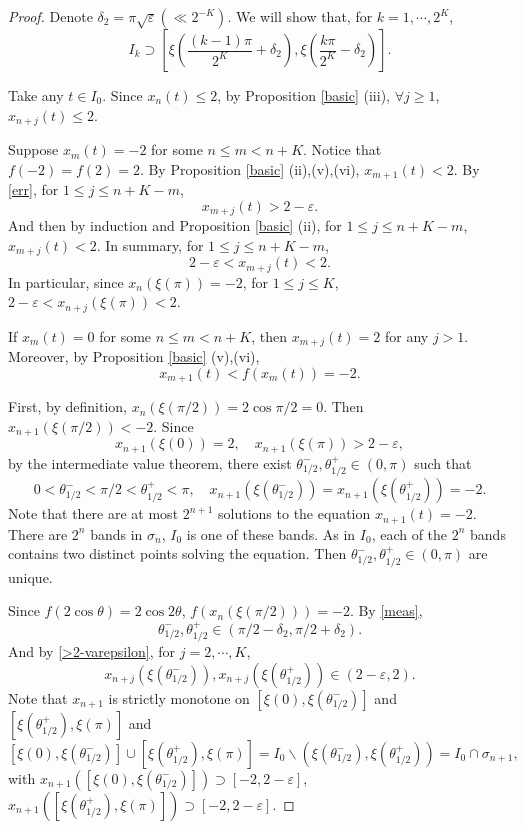 \documentclass{amsart}
\theoremstyle{definition}
\begin{document}
\begin{proof}
Denote $\delta_2=\pi\sqrt{\varepsilon}(\ll 2^{-K})$. 
We will show that, for $k=1,\cdots,2^K$,
$$I_k\supset[\xi(\frac{(k-1)\pi}{2^K}+\delta_2),\xi(\frac{k\pi}{2^K}-\delta_2)].$$

Take any $t\in I_0$. Since $x_n(t)\le2$, 
by Proposition \ref{basic} (iii), $\forall j\ge1$, $x_{n+j}(t)\le2$.

Suppose $x_m(t)=-2$ for some $n\le m< n+K$. Notice that $f(-2)=f(2)=2$.
By Proposition \ref{basic} (ii),(v),(vi), $x_{m+1}(t)<2.$
By \eqref{err}, for $1\le j\le n+K-m$,
\begin{equation}
    \label{>2-varepsilon}
x_{m+j}(t)>2-\varepsilon.
\end{equation}
And then by induction and Proposition \ref{basic} (ii), for $1\le j\le n+K-m$,
$x_{m+j}(t)<2.$
In summary, for $1\le j\le n+K-m$,
$$2-\varepsilon<x_{m+j}(t)<2.$$ 
In particular, since $x_n(\xi(\pi))=-2$, 
for $1\le j\le K$, $2-\varepsilon<x_{n+j}(\xi(\pi))<2$.


If $x_m(t)=0$ for some $n\le m< n+K$, then $x_{m+j}(t)=2$ for any $j>1$. 
Moreover, by Proposition \ref{basic} (v),(vi),
$$x_{m+1}(t)<f(x_m(t))=-2.$$

First, by definition, $x_n(\xi(\pi/2))=2\cos\pi/2=0$. 
Then $x_{n+1}(\xi(\pi/2))<-2$.
Since $$x_{n+1}(\xi(0))=2,\quad x_{n+1}(\xi(\pi))>2-\varepsilon,$$ 
by the intermediate value theorem, there exist $\theta^{-}_{1/2},\theta^{+}_{1/2}\in(0,\pi)$ such that
$$0<\theta^{-}_{1/2}<\pi/2<\theta^{+}_{1/2}<\pi,\quad
x_{n+1}(\xi(\theta^{-}_{1/2}))=x_{n+1}(\xi(\theta^{+}_{1/2}))=-2.$$
Note that there are at most $2^{n+1}$ solutions to the equation $x_{n+1}(t)=-2$.
There are $2^n$ bands in $\sigma_n$, $I_0$ is one of these bands.
As in $I_0$,  each of the $2^n$ bands contains  two distinct points solving the equation.
Then $\theta^{-}_{1/2},\theta^{+}_{1/2}\in(0,\pi)$ are unique.

Since $f(2\cos\theta)=2\cos2\theta$, $f(x_n(\xi(\pi/2)))=-2$. By \eqref{meas}, 
$$\theta^{-}_{1/2}, \theta^{+}_{1/2}\in(\pi/2-\delta_2,\pi/2+\delta_2).$$
And by \eqref{>2-varepsilon}, for $j=2,\cdots,K$,
$$x_{n+j}(\xi(\theta^{-}_{1/2})),x_{n+j}(\xi(\theta^{+}_{1/2}))\in(2-\varepsilon,2).$$
Note that $x_{n+1}$ is strictly monotone on $[\xi(0),\xi(\theta^{-}_{1/2})]$ 
and $[\xi(\theta^{+}_{1/2}),\xi(\pi)]$ and
$$[\xi(0),\xi(\theta^{-}_{1/2})]\cup[\xi(\theta^{+}_{1/2}),\xi(\pi)]
=I_0\backslash(\xi(\theta^{-}_{1/2}),\xi(\theta^{+}_{1/2}))
=I_0\cap \sigma_{n+1},$$
with $x_{n+1}([\xi(0),\xi(\theta^{-}_{1/2})])\supset [-2,2-\varepsilon]$,
$x_{n+1}([\xi(\theta^{+}_{1/2}),\xi(\pi)])\supset [-2,2-\varepsilon]$.


\end{proof}
\end{document}
